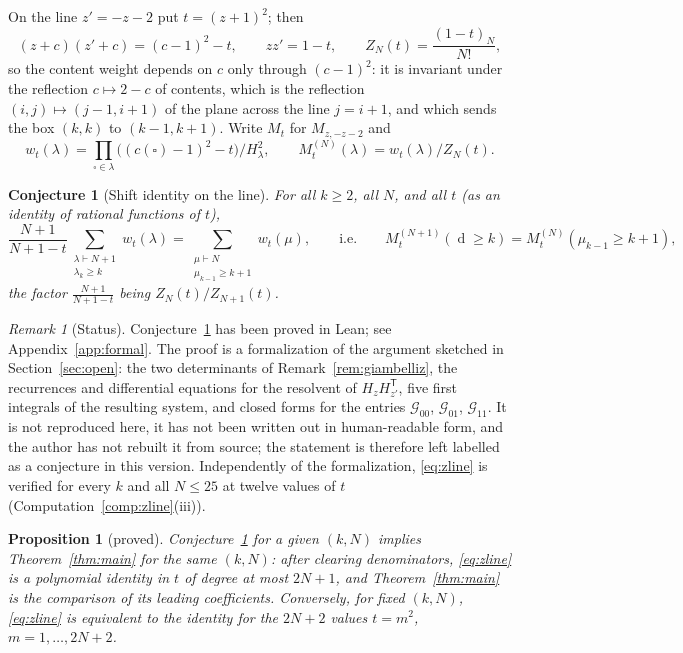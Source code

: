 \documentclass[11pt]{article}
\newtheorem{proposition}[theorem]{Proposition}
\newtheorem{conjecture}[theorem]{Conjecture}
\theoremstyle{definition}
\theoremstyle{remark}
\newtheorem{remark}[theorem]{Remark}
\DeclareMathOperator{\Durfee}{d}
\begin{document}
On the line $z'=-z-2$ put $t=(z+1)^2$; then
\begin{equation}\label{eq:weight}
(z+c)(z'+c)=(c-1)^2-t,\qquad zz'=1-t,\qquad Z_N(t)=\frac{(1-t)_N}{N!},
\end{equation}
so the content weight depends on $c$ only through $(c-1)^2$: it is invariant under the reflection $c\mapsto2-c$ of contents, which is the reflection $(i,j)\mapsto(j-1,i+1)$ of the plane across the line $j=i+1$, and which sends the box $(k,k)$ to $(k-1,k+1)$. Write $M_t$ for $M_{z,-z-2}$ and
\[
w_t(\lambda)=\prod_{\square\in\lambda}\bigl((c(\square)-1)^2-t\bigr)\Big/H_\lambda^2,\qquad M^{(N)}_t(\lambda)=w_t(\lambda)/Z_N(t).
\]

\begin{conjecture}[Shift identity on the line]\label{conj:zline}
For all $k\ge2$, all $N$, and all $t$ (as an identity of rational functions of $t$),
\begin{equation}\label{eq:zline}
\frac{N+1}{N+1-t}\sum_{\substack{\lambda\vdash N+1\\ \lambda_k\ge k}}w_t(\lambda)=\sum_{\substack{\mu\vdash N\\ \mu_{k-1}\ge k+1}}w_t(\mu),
\qquad\text{i.e.}\qquad M^{(N+1)}_t(\Durfee\ge k)=M^{(N)}_t(\mu_{k-1}\ge k+1),
\end{equation}
the factor $\frac{N+1}{N+1-t}$ being $Z_N(t)/Z_{N+1}(t)$.
\end{conjecture}

\begin{remark}[Status]\label{rem:zlinestatus}
Conjecture~\ref{conj:zline} has been proved in Lean; see Appendix~\ref{app:formal}. The proof is a
formalization of the argument sketched in Section~\ref{sec:open}: the two determinants of
Remark~\ref{rem:giambelliz}, the recurrences and differential equations for the resolvent of
$H_zH_{z'}^{\mathsf T}$, five first integrals of the resulting system, and closed forms for the
entries $\mathcal G_{00}$, $\mathcal G_{01}$, $\mathcal G_{11}$. It is not reproduced here, it has
not been written out in human-readable form, and the author has not rebuilt it from source; the
statement is therefore left labelled as a conjecture in this version. Independently of the
formalization, \eqref{eq:zline} is verified for every $k$ and all $N\le25$ at twelve values of $t$
(Computation~\ref{comp:zline}(iii)).
\end{remark}

\begin{proposition}[proved]\label{prop:topcoef}
Conjecture~\ref{conj:zline} for a given $(k,N)$ implies Theorem~\ref{thm:main} for the same $(k,N)$: after clearing denominators, \eqref{eq:zline} is a polynomial identity in $t$ of degree at most $2N+1$, and Theorem~\ref{thm:main} is the comparison of its leading coefficients. Conversely, for fixed $(k,N)$, \eqref{eq:zline} is equivalent to the identity for the $2N+2$ values $t=m^2$, $m=1,\dots,2N+2$.
\end{proposition}
\end{document}
